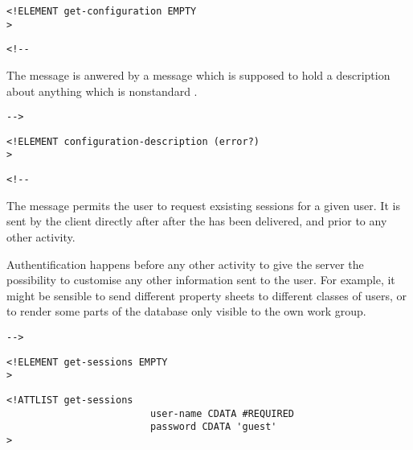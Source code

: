 \begin{verbatim}
<!ELEMENT get-configuration EMPTY 
>\end{verbatim}

\begin{verbatim}<!--\end{verbatim}
  



The  message is anwered by  a  message which
is supposed to hold a description about anything which is nonstandard \MRML.


       
 \begin{verbatim}-->\end{verbatim}



\begin{verbatim}
<!ELEMENT configuration-description (error?) 
>\end{verbatim}

\begin{verbatim}<!--\end{verbatim}
   


     The  message permits the user to request
     exsisting sessions for a given user. It is sent by the client
     directly after after the  has
     been delivered, and prior to any other activity. 

     Authentification happens before any other activity to give the 
     server the possibility to customise any other information sent
     to the user. For example, it might be sensible to send different
     property sheets to different classes of users, or to render some
     parts of the database only visible to the own work group.
     
       
 \begin{verbatim}-->\end{verbatim}



\begin{verbatim}
<!ELEMENT get-sessions EMPTY 
>\end{verbatim}

\begin{verbatim}
<!ATTLIST get-sessions 
                         user-name CDATA #REQUIRED
                         password CDATA 'guest'
>\end{verbatim}

